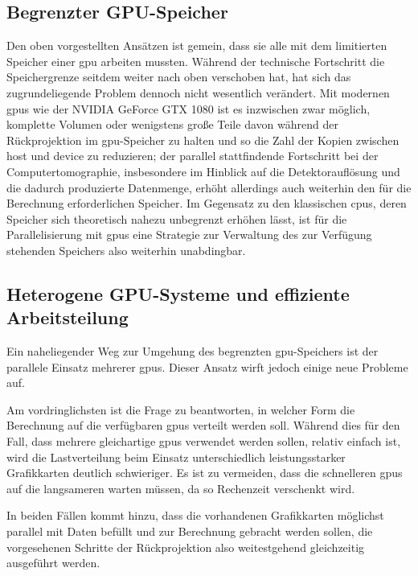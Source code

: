 \subsection{Begrenzter GPU-Speicher}

Den oben vorgestellten Ansätzen ist gemein, dass sie alle mit dem limitierten Speicher einer \gls{gpu} arbeiten mussten.
Während der technische Fortschritt die Speichergrenze seitdem weiter nach oben verschoben hat, hat sich das
zugrundeliegende Problem dennoch nicht wesentlich verändert. Mit modernen \gls{gpu}s wie der NVIDIA GeForce GTX 1080 ist
es inzwischen zwar möglich, komplette Volumen oder wenigstens große Teile davon während der Rückprojektion im
\gls{gpu}-Speicher zu halten und so die Zahl der Kopien zwischen \gls{host} und \gls{device} zu reduzieren; der parallel
stattfindende Fortschritt bei der Computertomographie, insbesondere im Hinblick auf die Detektorauflösung und die
dadurch produzierte Datenmenge, erhöht allerdings auch weiterhin den für die Berechnung erforderlichen Speicher. Im
Gegensatz zu den klassischen \gls{cpu}s, deren Speicher sich theoretisch nahezu unbegrenzt erhöhen lässt, ist für die
Parallelisierung mit \gls{gpu}s eine Strategie zur Verwaltung des zur Verfügung stehenden Speichers also weiterhin
unabdingbar.

\subsection{Heterogene GPU-Systeme und effiziente Arbeitsteilung}

Ein naheliegender Weg zur Umgehung des begrenzten \gls{gpu}-Speichers ist der parallele Einsatz mehrerer \gls{gpu}s.
Dieser Ansatz wirft jedoch einige neue Probleme auf.

Am vordringlichsten ist die Frage zu beantworten, in welcher Form die Berechnung auf die verfügbaren \gls{gpu}s verteilt
werden soll. Während dies für den Fall, dass mehrere gleichartige \gls{gpu}s verwendet werden sollen, relativ einfach
ist, wird die Lastverteilung beim Einsatz unterschiedlich leistungsstarker Grafikkarten deutlich schwieriger. Es ist zu
vermeiden, dass die schnelleren \gls{gpu}s auf die langsameren warten müssen, da so Rechenzeit verschenkt wird.

In beiden Fällen kommt hinzu, dass die vorhandenen Grafikkarten möglichst parallel mit Daten befüllt und zur Berechnung
gebracht werden sollen, die vorgesehenen Schritte der Rückprojektion also weitestgehend gleichzeitig ausgeführt werden.

